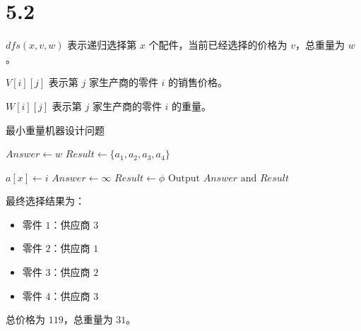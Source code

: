 \section*{5.2}

$dfs(x, v, w)$ 表示递归选择第 $x$ 个配件，当前已经选择的价格为 $v$，总重量为 $w$。

$V[i][j]$ 表示第 $j$ 家生产商的零件 $i$ 的销售价格。

$W[i][j]$ 表示第 $j$ 家生产商的零件 $i$ 的重量。

\begin{algorithm}[!htbp]
  \caption{最小重量机器设计问题}
  \begin{algorithmic}[1]
        \State $Answer \gets w$
        \State $Result \gets \{a_1, a_2, a_3, a_4\}$
      \EndIf
      \State \Return
    \EndIf

      \State $a[x] \gets i$
      \State {}
    \EndFor
  \EndProcedure
    \State $Answer \gets \infty$
    \State $Result \gets \phi$
    \State {}
    \State $\text{Output } Answer \text{ and } Result$
  \EndProcedure
  \end{algorithmic}
\end{algorithm}

最终选择结果为：

\begin{itemize}
  \item 零件 $1$：供应商 $3$
  \item 零件 $2$：供应商 $1$
  \item 零件 $3$：供应商 $2$
  \item 零件 $4$：供应商 $3$
\end{itemize}

总价格为 $119$，总重量为 $31$。
